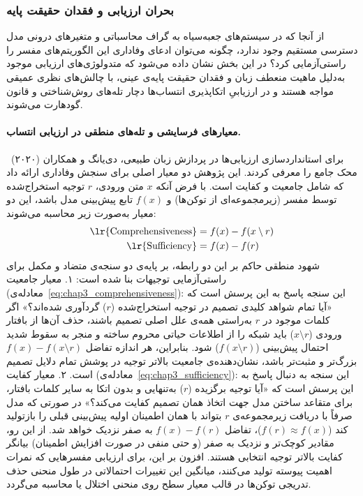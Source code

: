 \subsubsection{بحران ارزیابی و فقدان حقیقت پایه}\label{sec:3-1-3-4}

از آنجا که در سیستم‌های جعبه‌سیاه به گراف محاسباتی و متغیرهای درونی مدل دسترسی مستقیم وجود ندارد، چگونه می‌توان ادعای وفاداری این الگوریتم‌های مفسر را راستی‌آزمایی کرد؟ در این بخش نشان داده می‌شود که متدولوژی‌های ارزیابی موجود به‌دلیل ماهیت منعطف زبان و فقدان حقیقت پایه‌ی عینی، با چالش‌های نظری عمیقی مواجه هستند و در ارزیابیِ اتکاپذیری انتساب‌ها دچار تله‌های روش‌شناختی و قانون گودهارت می‌شوند.

\paragraph{معیارهای فرسایشی و تله‌های منطقی در ارزیابی انتساب.}

برای استانداردسازی ارزیابی‌ها در پردازش زبان طبیعی، دی‌یانگ و همکاران (۲۰۲۰)~\cite{deyoung2020eraser} محک جامع  را معرفی کردند. این پژوهش دو معیار اصلی برای سنجش وفاداری ارائه داد که شامل جامعیت و کفایت است. با فرض آنکه $x$ متن ورودی، $r$ توجیه استخراج‌شده توسط مفسر (زیرمجموعه‌ای از توکن‌ها) و $f(x)$ تابع پیش‌بینی مدل باشد، این دو معیار به‌صورت زیر محاسبه می‌شوند:
\begin{align}
    \text{\lr{Comprehensiveness}} &= f(x) - f(x \setminus r) \label{eq:chap3_comprehensiveness} \\
    \text{\lr{Sufficiency}} &= f(x) - f(r) \label{eq:chap3_sufficiency}
\end{align}
شهود منطقی حاکم بر این دو رابطه، بر پایه‌ی دو سنجه‌ی متضاد و مکمل برای راستی‌آزمایی توجیهات بنا شده است:
۱. معیار جامعیت (معادله‌ی~\ref{eq:chap3_comprehensiveness}): این سنجه پاسخ به این پرسش است که «آیا تمام شواهد کلیدی تصمیم در توجیه استخراج‌شده ($r$) گردآوری شده‌اند؟» اگر کلمات موجود در $r$ به‌راستی همه‌ی علل اصلی تصمیم باشند، حذف آن‌ها از بافتار ورودی ($x \setminus r$) باید شبکه را از اطلاعات حیاتی محروم ساخته و منجر به سقوط شدید احتمال پیش‌بینی ($f(x \setminus r)$) شود. بنابراین، هر اندازه تفاضل $f(x) - f(x \setminus r)$ بزرگ‌تر و مثبت‌تر باشد، نشان‌دهنده‌ی جامعیت بالاتر توجیه در پوشش تمام دلایل تصمیم است.
۲. معیار کفایت (معادله‌ی~\ref{eq:chap3_sufficiency}): این سنجه به دنبال پاسخ به این پرسش است که «آیا توجیه برگزیده ($r$) به‌تنهایی و بدون اتکا به سایر کلمات بافتار، برای متقاعد ساختن مدل جهت اتخاذ همان تصمیم کفایت می‌کند؟» در صورتی که مدل صرفاً با دریافت زیرمجموعه‌ی $r$ بتواند با همان اطمینان اولیه پیش‌بینی قبلی را بازتولید کند ($f(r) \approx f(x)$)، تفاضل $f(x) - f(r)$ به صفر نزدیک خواهد شد. از این رو، مقادیر کوچک‌تر و نزدیک به صفر (و حتی منفی در صورت افزایش اطمینان) بیانگر کفایت بالاتر توجیه انتخابی هستند.
افزون بر این، برای ارزیابی مفسرهایی که نمرات اهمیت پیوسته تولید می‌کنند، میانگین این تغییرات احتمالاتی در طول منحنی حذف تدریجی توکن‌ها در قالب معیار سطح روی منحنی اختلال یا  محاسبه می‌گردد.

